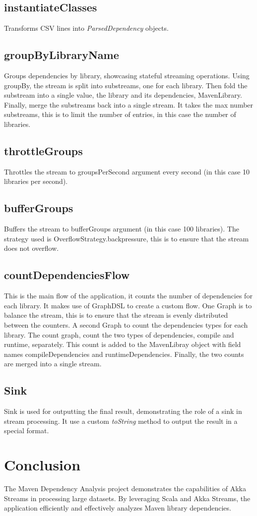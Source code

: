 \documentclass{article}
\begin{document}
    \subsection*{instantiateClasses}
    Transforms CSV lines into \textit{ParsedDependency} objects.
    \subsection*{groupByLibraryName}
    Groups dependencies by library, showcasing stateful streaming operations.
    Using groupBy, the stream is split into substreams, one for each library.
    Then fold the substream into a single value, the library and its dependencies, MavenLibrary.
    Finally, merge the substreams back into a single stream.
    It takes the max number substreams, this is to limit the number of entries, in this case the number of libraries.
    \subsection*{throttleGroups}
    Throttles the stream to groupsPerSecond argument every second (in this case 10 libraries per second).
    \subsection*{bufferGroups}
    Buffers the stream to bufferGroups argument (in this case 100 libraries).
    The strategy used is OverflowStrategy.backpressure, this is to ensure that the stream does not overflow.
    \subsection*{countDependenciesFlow}
    This is the main flow of the application, it counts the number of dependencies for each library.
    It makes use of GraphDSL to create a custom flow.
    One Graph is to balance the stream, this is to ensure that the stream is evenly distributed between the counters.
    A second Graph to count the dependencies types for each library.
    The count graph, count the two types of dependencies, compile and runtime, separately.
    This count is added to the MavenLibray object with field names compileDependencies and runtimeDependencies.
    Finally, the two counts are merged into a single stream.

    \subsection*{Sink}
    Sink is used for outputting the final result, demonstrating the role of a sink in stream processing. It use a custom \textit{toString} method to output the result in a special format.


    \section*{Conclusion}
    The Maven Dependency Analysis project demonstrates the capabilities of Akka Streams in processing large datasets. By leveraging Scala and Akka Streams, the application efficiently and effectively analyzes Maven library dependencies.
\end{document}
